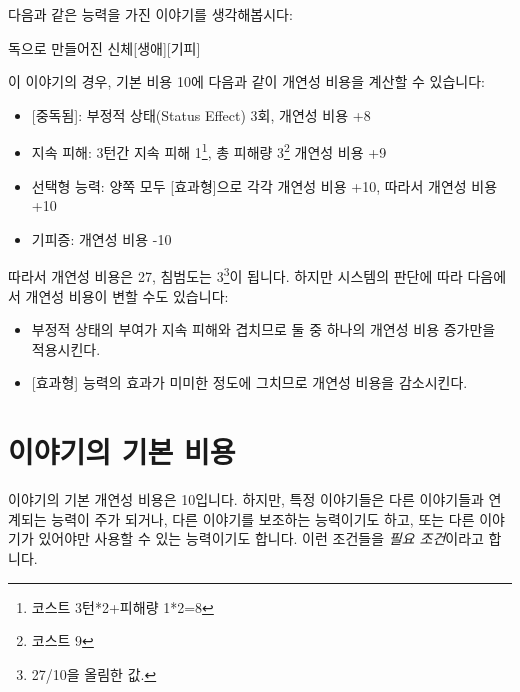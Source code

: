 \documentclass{report}
\begin{document}
	다음과 같은 능력을 가진 이야기를 생각해봅시다:
	\begin{story}{독으로 만들어진 신체}{[생애][기피]}
		
		
	\end{story}
	이 이야기의 경우, 기본 비용 10에 다음과 같이 개연성 비용을 계산할 수 있습니다:
	\begin{itemize}
		\item {}[중독됨]: 부정적 상태(Status Effect) 3회, 개연성 비용 +8
		\item 지속 피해: 3턴간 지속 피해 1\footnote{코스트 3턴*2+피해량 1*2=8}, 총 피해량 3\footnote{코스트 9} 개연성 비용 +9
		\item 선택형 능력: 양쪽 모두 [효과형]으로 각각 개연성 비용 +10, 따라서 개연성 비용 +10
		\item 기피증: 개연성 비용 -10
	\end{itemize}
	따라서 개연성 비용은 27, 침범도는 3\footnote{27/10을 올림한 값.}이 됩니다. 하지만 시스템의 판단에 따라 다음에서 개연성 비용이 변할 수도 있습니다:
	\begin{itemize}
		\item 부정적 상태의 부여가 지속 피해와 겹치므로 둘 중 하나의 개연성 비용 증가만을 적용시킨다.
		\item {}[효과형] 능력의 효과가 미미한 정도에 그치므로 개연성 비용을 감소시킨다.
	\end{itemize}
	
	\section*{이야기의 기본 비용}
	이야기의 기본 개연성 비용은 10입니다. 하지만, 특정 이야기들은 다른 이야기들과 연계되는 능력이 주가 되거나, 다른 이야기를 보조하는 능력이기도 하고, 또는 다른 이야기가 있어야만 사용할 수 있는 능력이기도 합니다. 이런 조건들을 \emph{필요 조건}이라고 합니다.
	
\end{document}
